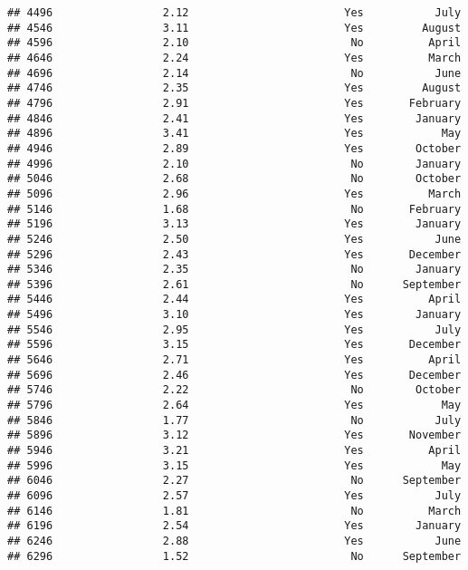 \documentclass[
]{article}
\begin{document}
\begin{verbatim}
## 4496                 2.12                        Yes           July
## 4546                 3.11                        Yes         August
## 4596                 2.10                         No          April
## 4646                 2.24                        Yes          March
## 4696                 2.14                         No           June
## 4746                 2.35                        Yes         August
## 4796                 2.91                        Yes       February
## 4846                 2.41                        Yes        January
## 4896                 3.41                        Yes            May
## 4946                 2.89                        Yes        October
## 4996                 2.10                         No        January
## 5046                 2.68                         No        October
## 5096                 2.96                        Yes          March
## 5146                 1.68                         No       February
## 5196                 3.13                        Yes        January
## 5246                 2.50                        Yes           June
## 5296                 2.43                        Yes       December
## 5346                 2.35                         No        January
## 5396                 2.61                         No      September
## 5446                 2.44                        Yes          April
## 5496                 3.10                        Yes        January
## 5546                 2.95                        Yes           July
## 5596                 3.15                        Yes       December
## 5646                 2.71                        Yes          April
## 5696                 2.46                        Yes       December
## 5746                 2.22                         No        October
## 5796                 2.64                        Yes            May
## 5846                 1.77                         No           July
## 5896                 3.12                        Yes       November
## 5946                 3.21                        Yes          April
## 5996                 3.15                        Yes            May
## 6046                 2.27                         No      September
## 6096                 2.57                        Yes           July
## 6146                 1.81                         No          March
## 6196                 2.54                        Yes        January
## 6246                 2.88                        Yes           June
## 6296                 1.52                         No      September

\end{verbatim}
\end{document}
